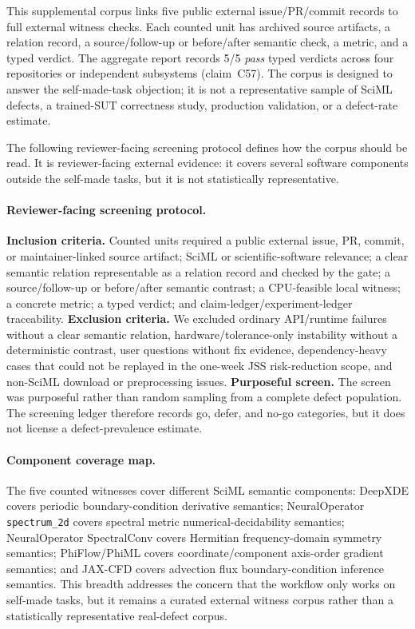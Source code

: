 \documentclass[preprint,12pt]{elsarticle}
\begin{document}
This supplemental corpus links five public external issue/PR/commit records to
full external witness checks. Each counted unit has archived source artifacts,
a relation record, a source/follow-up or before/after semantic check, a metric, and a
typed verdict. The aggregate report records 5/5 \emph{pass} typed verdicts
across four repositories or independent subsystems (claim~C57). The corpus is
designed to answer the self-made-task objection; it is not a representative
sample of SciML defects, a trained-SUT correctness study, production validation,
or a defect-rate estimate.

The following reviewer-facing screening protocol defines how the corpus should
be read. It is reviewer-facing external evidence: it covers several software
components outside the self-made tasks, but it is not statistically
representative.

\paragraph{Reviewer-facing screening protocol.}
\textbf{Inclusion criteria.} Counted units required a public external issue,
PR, commit, or maintainer-linked source artifact; SciML or
scientific-software relevance; a clear semantic relation representable as a relation record and checked by the gate; a source/follow-up or before/after semantic contrast; a
CPU-feasible local witness; a concrete metric; a typed verdict; and
claim-ledger/experiment-ledger traceability.
\textbf{Exclusion criteria.} We excluded ordinary API/runtime failures without
a clear semantic relation, hardware/tolerance-only instability without a
deterministic contrast, user questions without fix evidence, dependency-heavy
cases that could not be replayed in the one-week JSS risk-reduction scope, and
non-SciML download or preprocessing issues. \textbf{Purposeful screen.} The
screen was purposeful rather than random sampling from a complete defect
population. The screening ledger therefore records go, defer, and no-go
categories, but it does not license a defect-prevalence estimate.

\paragraph{Component coverage map.}
The five counted witnesses cover different SciML semantic components:
DeepXDE covers periodic boundary-condition derivative semantics;
NeuralOperator \texttt{spectrum\_2d} covers spectral metric numerical-decidability semantics; NeuralOperator SpectralConv covers
Hermitian frequency-domain symmetry semantics; PhiFlow/PhiML covers
coordinate/component axis-order gradient semantics; and JAX-CFD covers
advection flux boundary-condition inference semantics. This breadth addresses
the concern that the workflow only works on self-made tasks, but it remains a
curated external witness corpus rather than a statistically representative
real-defect corpus.
\end{document}

